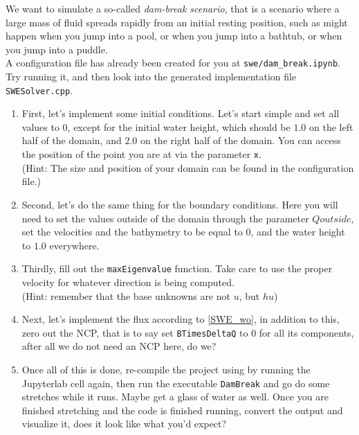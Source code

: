 \documentclass[12pt,letterpaper]{article}
\begin{document}
We want to simulate a so-called \textit{dam-break scenario}, that is a scenario where a large mass of fluid spreads rapidly from an
initial resting position, such as might happen when you jump into a pool, or when you jump into a bathtub, or when you jump into a puddle. \\
A configuration file has already been created for you at \texttt{swe/dam\_break.ipynb}.
Try running it, and then look into the generated implementation file \texttt{SWESolver.cpp}.\\

\begin{enumerate}
    \item
        First, let's implement some initial conditions. Let's start simple and set all values to $0$, except for the initial water height,
        which should be $1.0$ on the left half of the domain, and $2.0$ on the right half of the domain.
        You can access the position of the point you are at via the parameter \texttt{x}.\\
        (Hint: The size and position of your domain can be found in the configuration file.)
    \item
        Second, let's do the same thing for the boundary conditions. Here you will need to set the values outside of the domain through the
        parameter $Qoutside$, set the velocities and the bathymetry to be equal to $0$, and the water height to $1.0$ everywhere.
    \item
        Thirdly, fill out the \texttt{maxEigenvalue} function. Take care to use the proper velocity for whatever direction is being computed.\\
        (Hint: remember that the base unknowns are not $u$, but $hu$)
    \item
        Next, let's implement the flux according to \ref{SWE_wo}, in addition to this, zero out the NCP, that is to say set \texttt{BTimesDeltaQ} to $0$
        for all its components, after all we do not need an NCP here, do we?
    \item
        Once all of this is done, re-compile the project using by running the Jupyterlab cell again,
        then run the executable \texttt{DamBreak} and go do some stretches while it runs.
        Maybe get a glass of water as well. Once you are finished stretching and the code is finished running,
        convert the output and visualize it, does it look like what you'd expect?
\end{enumerate}

\vspace{1cm}
\end{document}
